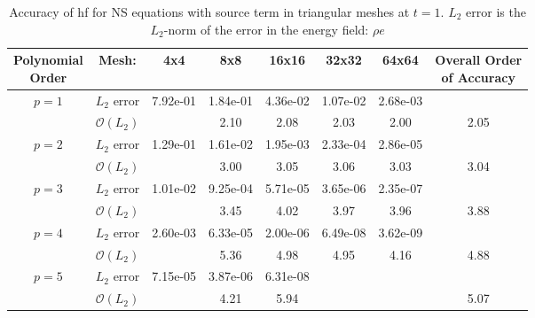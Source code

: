 
\begin{table}[htbp]

  \hspace{-1.1cm}
\begin{tabular}{ c c c c c c c c} 

 \specialcell{Polynomial\vspace{0.2cm}\\ Order}  & Mesh: & 4x4 & 8x8 & 16x16 & 32x32 & 64x64 & \specialcell{Overall Order \vspace{0.2cm}\\ of Accuracy}  \\ 
 \hline 
 \multirow{2}{*}{$p = 1$} & $L_2$ error & 7.92e-01 & 1.84e-01 & 4.36e-02 & 1.07e-02 & 2.68e-03 &   \\ 
  
   & $\mathcal{O}(L_2)$ &   & 2.10 & 2.08 & 2.03 & 2.00 & 2.05 \\ 
 \hline 
 \multirow{2}{*}{$p = 2$} & $L_2$ error & 1.29e-01 & 1.61e-02 & 1.95e-03 & 2.33e-04 & 2.86e-05 &   \\ 
  
   & $\mathcal{O}(L_2)$ &   & 3.00 & 3.05 & 3.06 & 3.03 & 3.04 \\ 
 \hline 
 \multirow{2}{*}{$p = 3$} & $L_2$ error & 1.01e-02 & 9.25e-04 & 5.71e-05 & 3.65e-06 & 2.35e-07 &   \\ 
  
   & $\mathcal{O}(L_2)$ &   & 3.45 & 4.02 & 3.97 & 3.96 & 3.88 \\ 
 \hline 
 \multirow{2}{*}{$p = 4$} & $L_2$ error & 2.60e-03 & 6.33e-05 & 2.00e-06 & 6.49e-08 & 3.62e-09 &   \\ 
  
   & $\mathcal{O}(L_2)$ &   & 5.36 & 4.98 & 4.95 & 4.16 & 4.88 \\ 
 \hline 
 \multirow{2}{*}{$p = 5$} & $L_2$ error & 7.15e-05 & 3.87e-06 & 6.31e-08 &   &   &   \\ 
  
   & $\mathcal{O}(L_2)$ &   & 4.21 & 5.94 &   &   & 5.07 \\ 
 \hline 
 \end{tabular}
\caption{Accuracy of \gls{hf} for NS equations with source term in triangular meshes at $t = 1$. $L_2$ error is the $L_2$-norm of the error in the energy field: $\rho e$}
\label{table:trisError1} 
 \end{table}
